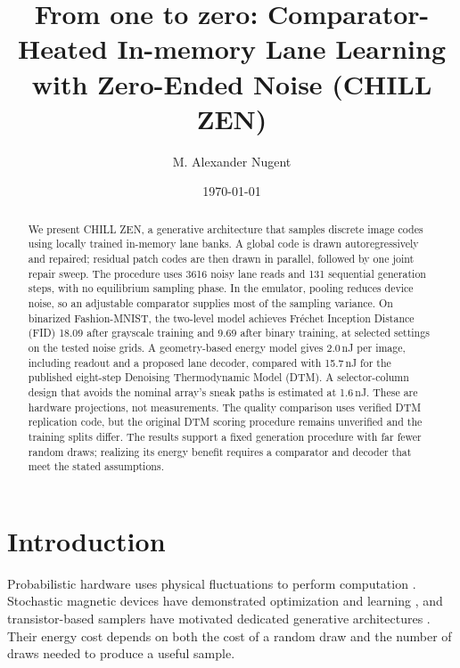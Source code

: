 \documentclass[reprint,amsmath,amssymb,aps,pra,floatfix,nofootinbib]{revtex4-2}
\begin{document}
\raggedbottom
{}
\title{From one to zero: Comparator-Heated In-memory Lane Learning
  with Zero-Ended Noise (CHILL ZEN)}
\author{M. Alexander Nugent}
\date{\today}

\begin{abstract}
We present CHILL ZEN, a generative architecture that samples discrete image codes using locally trained in-memory lane banks. A global code is drawn autoregressively and repaired; residual patch codes are then drawn in parallel, followed by one joint repair sweep. The procedure uses 3616 noisy lane reads and 131 sequential generation steps, with no equilibrium sampling phase. In the emulator, pooling reduces device noise, so an adjustable comparator supplies most of the sampling variance. On binarized Fashion-MNIST, the two-level model achieves Fr\'echet Inception Distance (FID) 18.09 after grayscale training and 9.69 after binary training, at selected settings on the tested noise grids. A geometry-based energy model gives 2.0\,nJ per image, including readout and a proposed lane decoder, compared with 15.7\,nJ for the published eight-step Denoising Thermodynamic Model (DTM). A selector-column design that avoids the nominal array's sneak paths is estimated at 1.6\,nJ. These are hardware projections, not measurements. The quality comparison uses verified DTM replication code, but the original DTM scoring procedure remains unverified and the training splits differ. The results support a fixed generation procedure with far fewer random draws; realizing its energy benefit requires a comparator and decoder that meet the stated assumptions.
\end{abstract}
\maketitle

\section{Introduction}
Probabilistic hardware uses physical fluctuations to perform computation \cite{conte2019thermodynamic}. Stochastic magnetic devices have demonstrated optimization and learning \cite{sutton2017intrinsic,borders2019integer,niazi2024training}, and transistor-based samplers have motivated dedicated generative architectures \cite{jelincic2025dtm,freitas2025taming}. Their energy cost depends on both the cost of a random draw and the number of draws needed to produce a useful sample.
\end{document}
